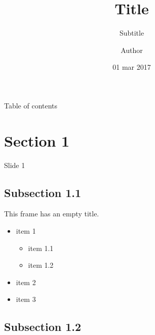 \documentclass{beamer}
\title{Title}
\subtitle{Subtitle}
\author{Author}
\date{01 mar 2017}
\begin{document}
    \begin{frame}
        \maketitle
    \end{frame}
    
    \begin{frame}{Table of contents}
      \tableofcontents
    \end{frame}
    
    \section{Section 1}
    \begin{frame}{Slide 1}
        \lipsum[1]
    \end{frame}
    
    \subsection{Subsection 1.1}
    \begin{frame}
        This frame has an empty title.
        \vfill
        \begin{itemize}
            \item item 1
            \begin{itemize}
                \item item 1.1
                \item item 1.2
            \end{itemize}
            \item item 2
            \item item 3
        \end{itemize}
    \end{frame}
    
    \subsection{Subsection 1.2}
    
\end{document}
